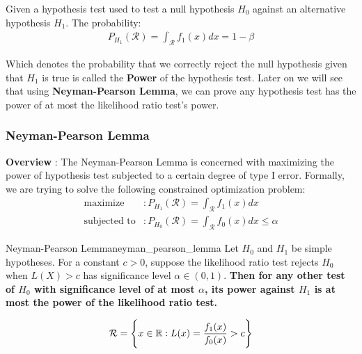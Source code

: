 \begin{definition}
    Given a hypothesis test used to test a null hypothesis $H_0$ against an alternative hypothesis $H_1$. The probability:
    \begin{align*}
        P_{H_1}(\mathcal{R}) = \int_{\mathcal{R}} f_1(x)dx = 1 - \beta
    \end{align*}

    \noindent Which denotes the probability that we correctly reject the null hypothesis given that $H_1$ is true  is called the \textbf{Power} of the hypothesis test. Later on we will see that using \textbf{Neyman-Pearson Lemma}, we can prove any hypothesis test has the power of at most the likelihood ratio test's power. 
\end{definition}


\subsubsection{Neyman-Pearson Lemma}
\textbf{Overview} : The Neyman-Pearson Lemma is concerned with maximizing the power of hypothesis test subjected to a certain degree of type I error. Formally, we are trying to solve the following constrained optimization problem:
\begin{align*}
    \text{maximize} &: P_{H_1}(\mathcal{R}) = \int_\mathcal{R} f_1(x)dx 
    \\
    \text{subjected to} &: P_{H_0}(\mathcal{R}) = \int_\mathcal{R}f_0(x) dx \le \alpha
\end{align*}

\begin{theorem}{Neyman-Pearson Lemma}{neyman_pearson_lemma}
    Let $H_0$ and $H_1$ be simple hypotheses. For a constant $c>0$, suppose the likelihood ratio test rejects $H_0$ when $L(X) > c$ has significance level $\alpha\in(0,1)$. \textbf{Then for any other test of $H_0$ with significance level of at most $\alpha$, its power against $H_1$ is at most the power of the likelihood ratio test.}

    \begin{align*}
        \mathcal{R} = \Bigg\{ 
            x \in \mathbb{R} : L(x) = \frac{f_1(x)}{f_0(x)} > c
         \Bigg\}
    \end{align*}
\end{theorem}

\begin{proof*}
    
\end{proof*}


